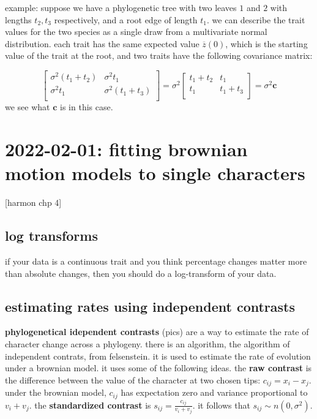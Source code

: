 \documentclass{article}
\begin{document}
example: suppose we have a phylogenetic tree with two leaves $1$ and $2$ with
lengths $t_{2},t_{3}$ respectively, and a root edge of length $t_{1}$. we can
describe the trait values for the two species as a single draw from a
multivariate normal distribution. each trait has the same expected value
$\overline{z}(0)$, which is the starting value of the trait at the root, and two
traits have the following covariance matrix:

\begin{equation*}
  \begin{bmatrix}
    \sigma^2 (t_1 + t_2) & \sigma^2 t_1 \\
    \sigma^2 t_1 & \sigma^2 (t_1 + t_3) \\
\end{bmatrix}
= \sigma^2
\begin{bmatrix}
    t_1 + t_2 & t_1 \\
    t_1 & t_1 + t_3 \\
\end{bmatrix} = \sigma^2 \mathbf{c}
\end{equation*}
we see what $\mathbf{c}$ is in this case.

\section{2022-02-01: fitting brownian motion models to single characters}
[harmon chp 4]
\subsection{log transforms}
if your data is a continuous trait and you think percentage changes matter more
than absolute changes, then you should do a log-transform of your data.

\subsection{estimating rates using independent contrasts}

\textbf{phylogenetical idependent contrasts} (pics) are a way to estimate the
rate of character change across a phylogeny. there is an algorithm, the
algorithm of independent contrats, from felsenstein. it is used to estimate the
rate of evolution under a brownian model. it uses some of the following ideas.
the \textbf{raw contrast} is the difference between the value of the character
at two chosen tips: $c_{ij} = x_{i}-x_{j}$. under the brownian model, $c_{ij}$
has expectation zero and variance proportional to $v_{i}+v_{j}$. the
\textbf{standardized contrast} is $s_{ij} = \frac{c_{ij}}{v_{i}+v_{j}}$. it
follows that $s_{ij}\sim n(0,\sigma^{2})$.
\end{document}
